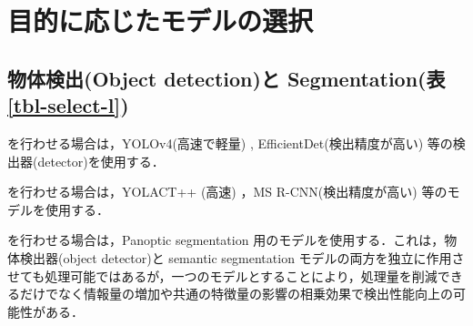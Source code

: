 \documentclass[twocolumn]{jsarticle} %
\begin{document}

\section{目的に応じたモデルの選択}
\subsection{物体検出(Object detection)と Segmentation(表\ref{tbl-select-l})}
を行わせる場合は，YOLOv4(高速で軽量) \cite{BWL20}, EfficientDet(検出精度が高い) \cite{TPL20}等の検出器(detector)を使用する．

を行わせる場合は，YOLACT++ (高速) \cite{BZXL20}，MS R-CNN(検出精度が高い) \cite{HHGHW19} 等のモデルを使用する．

を行わせる場合は，Panoptic segmentation 用のモデル\cite{KHGRD19}を使用する．これは，物体検出器(object detector)と semantic segmentation モデルの両方を独立に作用させても処理可能ではあるが，一つのモデルとすることにより，処理量を削減できるだけでなく情報量の増加や共通の特徴量の影響の相乗効果で検出性能向上の可能性がある．
\end{document}

